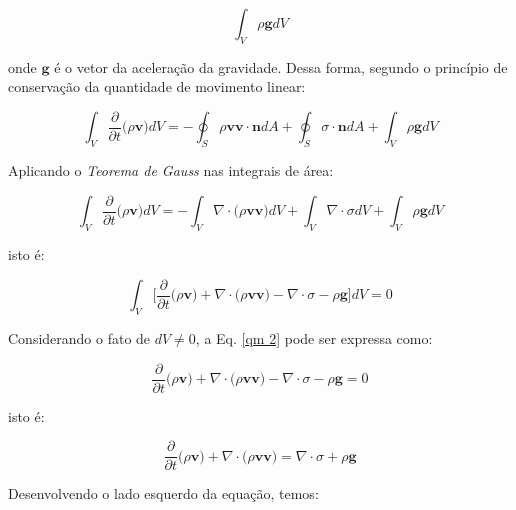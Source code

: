 \begin{equation} 
 \int_{V} \rho \textbf{g} dV
\end{equation}

\medskip
\noindent
onde $\textbf{g}$ é o vetor da aceleração da gravidade.
Dessa forma, segundo o princípio de conservação da quantidade
de movimento linear:

\begin{equation}
 \int_{V} \frac{\partial}{\partial t} \big( \rho \textbf{v} \big) dV
 = - 
 \oint_{S} \rho \textbf{v} \textbf{v} \cdot \textbf{n} dA
 +
 \oint_{S} \sigma \cdot \textbf{n} dA
 +
 \int_{V} \rho \textbf{g} dV
\end{equation}

\medskip
\noindent
Aplicando o \textit{Teorema de Gauss} nas integrais
de área:

\begin{equation}
 \int_{V} \frac{\partial}{\partial t} \big( \rho \textbf{v} \big) dV
 = - 
 \int_{V} \nabla \cdot \big( \rho \textbf{v} \textbf{v} \big) dV
 +
 \int_{V} \nabla \cdot \sigma dV
 +
 \int_{V} \rho \textbf{g} dV
\end{equation}

\medskip
\noindent
isto é:

\begin{equation} \label{qm 2}
 \int_{V} \Bigg[ \frac{\partial}{\partial t} \big( \rho \textbf{v} \big)
 + 
 \nabla \cdot \big( \rho \textbf{v} \textbf{v} \big)
 -
 \nabla \cdot \sigma
 -
 \rho \textbf{g} \Bigg] dV = 0
\end{equation}



\medskip
\noindent
Considerando o fato de $dV \neq 0$,
a Eq. \ref{qm 2} pode ser expressa como:

\begin{equation}
 \frac{\partial}{\partial t} \big( \rho \textbf{v} \big)
 + 
 \nabla \cdot \big( \rho \textbf{v} \textbf{v} \big)
 -
 \nabla \cdot \sigma
 -
 \rho \textbf{g} = 0
\end{equation}


\medskip
\noindent
isto é:

\begin{equation}
 \frac{\partial}{\partial t} \big( \rho \textbf{v} \big) 
 +
 \nabla \cdot \big( \rho \textbf{v} \textbf{v} \big)
 =
 \nabla \cdot \sigma
 +
 \rho \textbf{g}
\end{equation}

\medskip
\noindent
Desenvolvendo o lado esquerdo da equação, temos:

